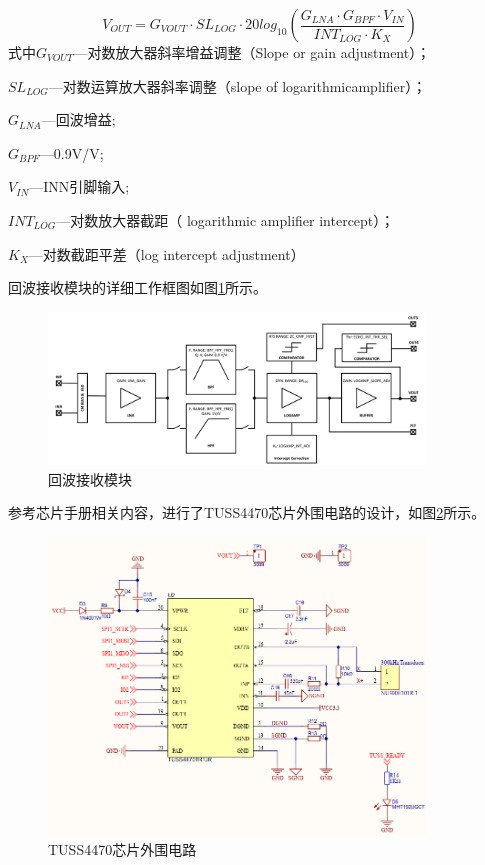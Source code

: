     \begin{equation}
        V_{OUT}=G_{VOUT} \cdot SL_{LOG}\cdot20log_{10}(\frac{G_{LNA} \cdot G_{BPF} \cdot V_{IN}}{INT_{LOG} \cdot K_X})
        \label{VOUT公式}
    \end{equation}
式中\quad $G_{VOUT}$---对数放大器斜率增益调整（Slope or gain adjustment）；\par
\quad$SL_{LOG}$---对数运算放大器斜率调整（slope of logarithmicamplifier）；\par
\quad$G_{LNA}$---回波增益;\par
\quad$G_{BPF}$---0.9V/V;\par
\quad$V_{IN}$---INN引脚输入;\par
\quad$INT_{LOG}$---对数放大器截距（ logarithmic amplifier intercept）；\par
\quad$K_X$---对数截距平差（log intercept adjustment）\par
    回波接收模块的详细工作框图如图\ref{回波接收模块}所示。
    \begin{figure}[ht]
        \centering
        \includegraphics[width=10cm]{figure/Analog Front-End Block Diagram.png}
        \caption{回波接收模块}
        \label{回波接收模块}
    \end{figure}\par

    参考芯片手册相关内容，进行了TUSS4470芯片外围电路的设计，如图\ref{TUSS4470芯片外围电路}所示。
    \begin{figure}[ht]
        \centering
        \includegraphics[width=10cm]{figure/TUSS4470 peripheral circuit.png}
        \caption{TUSS4470芯片外围电路}
        \label{TUSS4470芯片外围电路}
    \end{figure}
